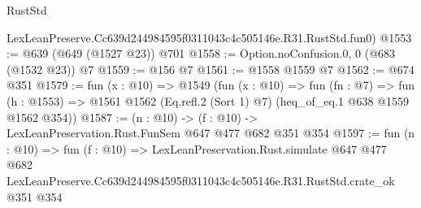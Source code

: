 \begin{lexlean}{RustStd}
\begin{coremodule}
    LexLeanPreserve.Cc639d244984595f0311043c4c505146e.R31.RustStd.fun0)
@1553 := @639 (@649 (@1527 @23)) @701
@1558 := Option.noConfusion.{0, 0} (@683 (@1532 @23)) @7
@1559 := @156 @7
@1561 := @1558 @1559 @7
@1562 := @674 @351
@1579 := fun (x : @10) =>
  @1549
    (fun (x : @10) =>
    fun (fn : @7) =>
    fun (h : @1553) => @1561 @1562 (Eq.refl.{2} (Sort 1) @7) (heq_of_eq.{1} @638 @1559 @1562 @354))
@1587 := (n : @10) -> (f : @10) -> LexLeanPreservation.Rust.FunSem @647 @477 @682 @351 @354
@1597 := fun (n : @10) =>
  fun (f : @10) =>
  LexLeanPreservation.Rust.simulate
    @647
    @477
    @682
    LexLeanPreserve.Cc639d244984595f0311043c4c505146e.R31.RustStd.crate_ok
    @351
    @354
\end{coremodule}
\end{lexlean}
